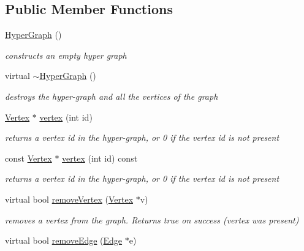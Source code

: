 \subsection*{Public Member Functions}
\begin{DoxyCompactItemize}
\item 
\mbox{\hyperlink{classg2o_1_1_hyper_graph_a833632b111cfc7cf08b842ae3cb43d41}{Hyper\+Graph}} ()
\begin{DoxyCompactList}\small\item\em constructs an empty hyper graph \end{DoxyCompactList}\item 
virtual \mbox{\hyperlink{classg2o_1_1_hyper_graph_a0ef6e1d65e0f9171a518bce3fc559693}{$\sim$\+Hyper\+Graph}} ()
\begin{DoxyCompactList}\small\item\em destroys the hyper-\/graph and all the vertices of the graph \end{DoxyCompactList}\item 
\mbox{\hyperlink{classg2o_1_1_hyper_graph_1_1_vertex}{Vertex}} $\ast$ \mbox{\hyperlink{classg2o_1_1_hyper_graph_ab07fe8bd9982a66ba34e83dff8317ea2}{vertex}} (int id)
\begin{DoxyCompactList}\small\item\em returns a vertex {\itshape id} in the hyper-\/graph, or 0 if the vertex id is not present \end{DoxyCompactList}\item 
const \mbox{\hyperlink{classg2o_1_1_hyper_graph_1_1_vertex}{Vertex}} $\ast$ \mbox{\hyperlink{classg2o_1_1_hyper_graph_ac117806d17a7e7ad7f8db42f2864cac9}{vertex}} (int id) const
\begin{DoxyCompactList}\small\item\em returns a vertex {\itshape id} in the hyper-\/graph, or 0 if the vertex id is not present \end{DoxyCompactList}\item 
virtual bool \mbox{\hyperlink{classg2o_1_1_hyper_graph_a97ab8302aa027d513253387bba9e0dd5}{remove\+Vertex}} (\mbox{\hyperlink{classg2o_1_1_hyper_graph_1_1_vertex}{Vertex}} $\ast$v)
\begin{DoxyCompactList}\small\item\em removes a vertex from the graph. Returns true on success (vertex was present) \end{DoxyCompactList}\item 
virtual bool \mbox{\hyperlink{classg2o_1_1_hyper_graph_a33e5a60705ce673d647aa1613da9d99b}{remove\+Edge}} (\mbox{\hyperlink{classg2o_1_1_hyper_graph_1_1_edge}{Edge}} $\ast$e)

\end{DoxyCompactItemize}
